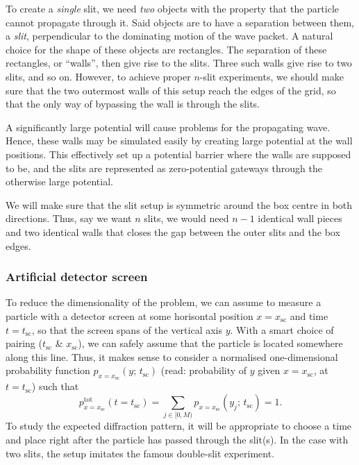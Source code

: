        To create a \textit{single} slit, we need \textit{two} objects with the property that the particle cannot propagate through it. Said objects are to have a separation between them, a \textit{slit}, perpendicular to the dominating motion of the wave packet. A natural choice for the shape of these objects are rectangles. The separation of these rectangles, or ``walls'', then give rise to the slits. Three such walls give rise to two slits, and so on. However, to achieve proper $n$-slit experiments, we should make sure that the two outermost walls of this setup reach the edges of the grid, so that the only way of bypassing the wall is through the slits.

        A significantly large potential will cause problems for the propagating wave. Hence, these walls may be simulated easily by creating large potential at the wall positions. This effectively set up a potential barrier where the walls are supposed to be, and the slits are represented as zero-potential gateways through the otherwise large potential.

        We will make sure that the slit setup is symmetric around the box centre in both directions. Thus, say we want $n$ slits, we would need $n-1$ identical wall pieces and two identical walls that closes the gap between the outer slits and the box edges.
    
    \subsubsection{Artificial detector screen}\label{sec:methods:simulation:screen}

        To reduce the dimensionality of the problem, we can assume to measure a particle with a detector screen at some horisontal position $x=x_\mathrm{sc}$ and time $t=t_\mathrm{sc}$, so that the screen spans of the vertical axis $y$. With a smart choice of pairing ($t_\mathrm{sc}$ \& $x_\mathrm{sc}$), we can safely assume that the particle is located somewhere along this line. Thus, it makes sense to consider a normalised one-dimensional probability function $p_{x=x_\mathrm{sc}}(y;\, t_\mathrm{sc})$ (read: probability of $y$ given $x=x_\mathrm{sc}$, at $t=t_\mathrm{sc}$) such that
        \begin{equation}\label{eq:tot_probability_along_y}
            p^\mathrm{tot}_{x=x_\mathrm{sc}}(t\!=\!t_\mathrm{sc}) =\sum_{j\in [0, M)} p_{x=x_\mathrm{sc}}(y_j;\, t_\mathrm{sc}) = 1.
        \end{equation}
        To study the expected diffraction pattern, it will be appropriate to choose a time and place right after the particle has passed through the slit(s). In the case with two slits, the setup imitates the famous double-slit experiment.

